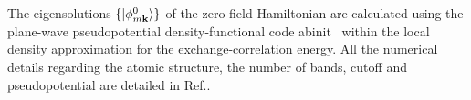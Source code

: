 The eigensolutions $\{|\phi^0_{m{\bf k}}\rangle \}$ of the zero-field Hamiltonian are calculated using the plane-wave pseudopotential density-functional code {\sc abinit}~\cite{abinit} within the local density approximation for the exchange-correlation energy. All the numerical details regarding the atomic structure, the number of bands, cutoff and  pseudopotential are detailed in Ref.\cite{gruningtddf1}. 
%
%
